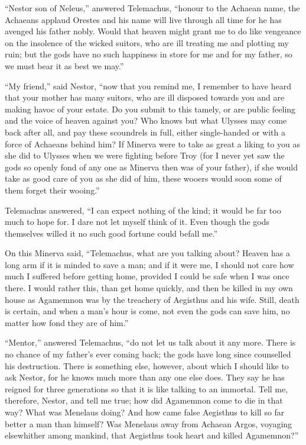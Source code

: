 “Nestor son of Neleus,” answered Telemachus, “honour to the Achaean name, the
Achaeans applaud Orestes and his name will live through all time for he has
avenged his father nobly. Would that heaven might grant me to do like vengeance
on the insolence of the wicked suitors, who are ill treating me and plotting my
ruin; but the gods have no such happiness in store for me and for my father, so
we must bear it as best we may.”

“My friend,” said Nestor, “now that you remind me, I remember to have heard
that your mother has many suitors, who are ill disposed towards you and are
making havoc of your estate. Do you submit to this tamely, or are public
feeling and the voice of heaven against you? Who knows but what Ulysses may
come back after all, and pay these scoundrels in full, either single-handed or
with a force of Achaeans behind him? If Minerva were to take as great a liking
to you as she did to Ulysses when we were fighting before Troy (for I never yet
saw the gods so openly fond of any one as Minerva then was of your father), if
she would take as good care of you as she did of him, these wooers would soon
some of them forget their wooing.”

Telemachus answered, “I can expect nothing of the kind; it would be far too
much to hope for. I dare not let myself think of it. Even though the gods
themselves willed it no such good fortune could befall me.”

On this Minerva said, “Telemachus, what are you talking about? Heaven has a
long arm if it is minded to save a man; and if it were me, I should not care
how much I suffered before getting home, provided I could be safe when I was
once there. I would rather this, than get home quickly, and then be killed in
my own house as Agamemnon was by the treachery of Aegisthus and his wife.
Still, death is certain, and when a man’s hour is come, not even the gods can
save him, no matter how fond they are of him.”

“Mentor,” answered Telemachus, “do not let us talk about it any more. There is
no chance of my father’s ever coming back; the gods have long since counselled
his destruction. There is something else, however, about which I should like to
ask Nestor, for he knows much more than any one else does. They say he has
reigned for three generations so that it is like talking to an immortal. Tell
me, therefore, Nestor, and tell me true; how did Agamemnon come to die in that
way? What was Menelaus doing? And how came false Aegisthus to kill so far
better a man than himself? Was Menelaus away from Achaean Argos, voyaging
elsewhither among mankind, that Aegisthus took heart and killed Agamemnon?”

